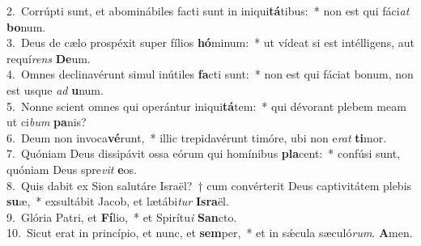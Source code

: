 {2.~}Corrúpti sunt, et abominábiles facti sunt in iniqui\textbf{tá}tibus:~* non est qui fáci\textit{at} \textbf{bo}num.\\
{3.~}Deus de cælo prospéxit super fílios \textbf{hó}minum:~* ut vídeat si est intélligens, aut requí\textit{rens} \textbf{De}um.\\
{4.~}Omnes declinavérunt simul inútiles \textbf{fa}cti sunt:~* non est qui fáciat bonum, non est usque \textit{ad} \textbf{u}num.\\
{5.~}Nonne scient omnes qui operántur iniqui\textbf{tá}tem:~* qui dévorant plebem meam ut ci\textit{bum} \textbf{pa}nis?\\
{6.~}Deum non invoca\textbf{vé}runt,~* illic trepidavérunt timóre, ubi non e\textit{rat} \textbf{ti}mor.\\
{7.~}Quóniam Deus dissipávit ossa eórum qui homínibus \textbf{pla}cent:~* confúsi sunt, quóniam Deus spre\textit{vit} \textbf{e}os.\\
{8.~}Quis dabit ex Sion salutáre Israël?~† cum convérterit Deus captivitátem plebis \textbf{su}æ,~* exsultábit Jacob, et lætábi\textit{tur} \textbf{Is}\textbf{ra}ël.\\
{9.~}Glória Patri, et \textbf{Fí}lio,~* et Spirítu\textit{i} \textbf{San}cto.\\
{10.~}Sicut erat in princípio, et nunc, et \textbf{sem}per,~* et in sǽcula sæculó\textit{rum}. \textbf{A}men.\\
